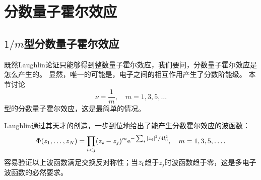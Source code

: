 \chapter{分数量子霍尔效应}

\section{$1/m$型分数量子霍尔效应}

既然Laughlin论证只能够得到整数量子霍尔效应，我们要问，分数量子霍尔效应是怎么产生的。
显然，唯一的可能是，电子之间的相互作用产生了分数阶能级。
本节讨论
\[
    \nu = \frac{1}{m}, \quad m = 1, 3, 5, \ldots
\]
型的分数量子霍尔效应，这是最简单的情况。

Laughlin通过其天才的创造，一步到位地给出了能产生分数霍尔效应的波函数：
\begin{equation}
    \Phi(z_1, \ldots, z_N) = \prod_{i < j} (z_{\vb*{i}} - z_j)^{m} \mathrm{e}^{- \sum_{\vb*{i}} \abs*{z_{\vb*{i}}}^2 / 4 l_0^2}, \quad m = 1, 3, 5, \ldots.
\end{equation}
容易验证以上波函数满足交换反对称性；当$z_{\vb*{i}}$趋于$z_j$时波函数趋于零，这是多电子波函数的必然要求。

